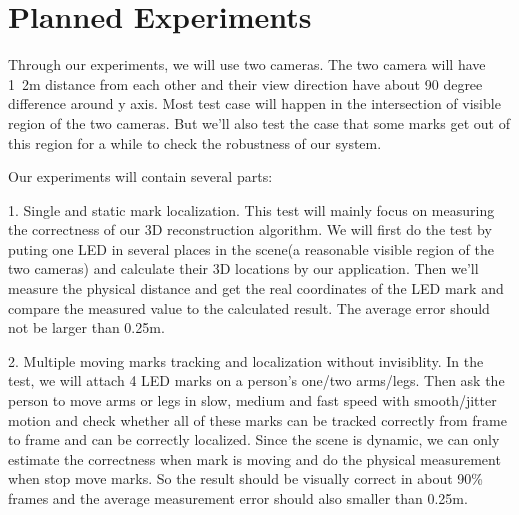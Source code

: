 \documentclass[10pt,twocolumn,letterpaper]{article}
\begin{document}
%

\section{Planned Experiments}
Through our experiments, we will use two cameras. The two camera will have 1~2m distance from each other and their view direction have about 90 degree difference around y axis. Most test case will happen in the intersection of visible region of the two cameras. But we'll also test the case that some marks get out of this region for a while to check the robustness of our system.


Our experiments will contain several parts:


1. Single and static mark localization. This test will mainly focus on measuring the correctness of our 3D reconstruction algorithm. We will first do the test by puting one LED in several places in the scene(a reasonable visible region of the two cameras) and calculate their 3D locations by our application. Then we'll measure the physical distance and get the real coordinates of the LED mark and compare the measured value to the calculated result. The average error should not be larger than 0.25m. 


2. Multiple moving marks tracking and localization without invisiblity. In the test, we will attach 4 LED marks on a person's one/two arms/legs. Then ask the person to move arms or legs in slow, medium and fast speed with smooth/jitter motion and check whether all of these marks can be tracked correctly from frame to frame and can be correctly localized. Since the scene is dynamic, we can only estimate the correctness when mark is moving and do the physical measurement when stop move marks. So the result should be visually correct in about 90\% frames and the average measurement error should also smaller than 0.25m.
\end{document}
